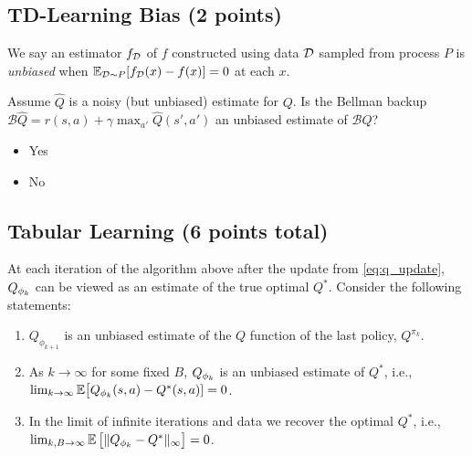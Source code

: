 \def\makecols#1#2{{\def\p{#2}\newcount\i\i0\hfill\loop\advance\i1\makebox[1cm][c]{\expandafter\p\the\i}\kern.5cm\ifnum\i<#1\repeat\kern-1cm}}
\def\heading#1{\bf\expandafter\uppercase\expandafter{\romannumeral#1.}}
\def\boxes#1{\ensuremath\square}
\def\filled#1#2|#3{\ifnum#1=#3\ensuremath\blacksquare
	\else\if\relax#2\relax\ensuremath\square
	\else\filled#2|#3\fi\fi}
\def\ncol{3}
\newcommand{\checkeditem}[2]{\edef\x{0#1}\item[\expandafter\filled\x|#2]}


\def\choices#1#2{
	\begin{enumerate}
	\item on-policy in tabular setting \makecols\ncol{\filled0#1|}
	\item off-policy in tabular setting \makecols\ncol{\filled0#2|}
	\end{enumerate}
}

\subsection{TD-Learning Bias (2 points)}
\label{q:td_bias}

\def\answer{} %
\ifsolutions\solve\thesubsection\fi
We say an estimator $f_{\mathcal{D}}$ of $f$ constructed using data $\mathcal{D}$ sampled from process $P$ is \textit{unbiased} when $\mathbb{E}_{\mathcal{D}\sim P}[f_{\mathcal{D}}(x)-f(x)]=0$ at each $x$.

Assume $\hat Q$ is a noisy (but unbiased) estimate for $Q$. Is the Bellman backup $\mathcal{B}\hat Q = r(s, a) + \gamma \max_{a'} \hat Q(s', a')$ an unbiased estimate of $\mathcal{B}Q$?
\begin{itemize}
    \checkeditem\answer1 Yes
    \checkeditem\answer2 No
\end{itemize}

\subsection{Tabular Learning (6 points total)}
\label{q:tabular_learning}

At each iteration of the algorithm above after the update from \cref{eq:q_update}, $Q_{\phi_k}$ can be viewed as an estimate of the true optimal $Q^*$. Consider the following statements: 
\begin{enumerate}[label=\bf\Roman*.]
  \item $Q_{\phi_{k+1}}$ is an unbiased estimate of the $Q$ function of the last policy, $Q^{\pi_k}$.
  \item As $k\to\infty$ for some fixed $B$, $Q_{\phi_k}$ is an unbiased estimate of $Q^*$, i.e., $\lim_{k\to\infty} \mathbb{E}\bigl[Q_{\phi_k}(s,a)-Q^*(s,a)]=0$.
  \item In the limit of infinite iterations and data we recover the optimal $Q^*$, i.e., $\lim_{k,B\to\infty}\mathbb{E}\,\bigl[\|Q_{\phi_k}-Q^*\|_\infty\bigr]=0$.
\end{enumerate}


